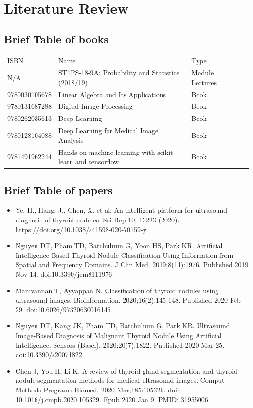 \chapter{Literature Review}
	\section{Brief Table of books}
	\begin{table}[H]
		\begin{tabular}{lllll}
			ISBN 			& Name 	& Type  &  &  \\
			N/A  			&ST1PS-18-9A: Probability and Statistics (2018/19)&Module Lectures&  &  \\
			9780030105678  	&Linear Algebra and Its Applications&Book&  &  \\
			9780131687288  	&Digital Image Processing&Book&  &  \\
			9780262035613  	&Deep Learning &Book&  &  \\
			9780128104088  	&Deep Learning for Medical Image Analysis&Book&  &  \\
			9781491962244  	&Hands-on machine learning with scikit-learn and tensorflow&Book&  &  \\
		\end{tabular}
	\end{table}
	\section{Brief Table of papers}
	\begin{itemize}
		\item Ye, H., Hang, J., Chen, X. et al. An intelligent platform for ultrasound diagnosis of thyroid nodules. Sci Rep 10, 13223 (2020). https://doi.org/10.1038/s41598-020-70159-y
		\item Nguyen DT, Pham TD, Batchuluun G, Yoon HS, Park KR. Artificial Intelligence-Based Thyroid Nodule Classification Using Information from Spatial and Frequency Domains. J Clin Med. 2019;8(11):1976. Published 2019 Nov 14. doi:10.3390/jcm8111976
		\item Manivannan T, Ayyappan N. Classification of thyroid nodules using ultrasound images. Bioinformation. 2020;16(2):145-148. Published 2020 Feb 29. doi:10.6026/97320630016145
		\item Nguyen DT, Kang JK, Pham TD, Batchuluun G, Park KR. Ultrasound Image-Based Diagnosis of Malignant Thyroid Nodule Using Artificial Intelligence. Sensors (Basel). 2020;20(7):1822. Published 2020 Mar 25. doi:10.3390/s20071822
		\item Chen J, You H, Li K. A review of thyroid gland segmentation and thyroid nodule segmentation methods for medical ultrasound images. Comput Methods Programs Biomed. 2020 Mar;185:105329. doi: 10.1016/j.cmpb.2020.105329. Epub 2020 Jan 9. PMID: 31955006.
	\end{itemize}
